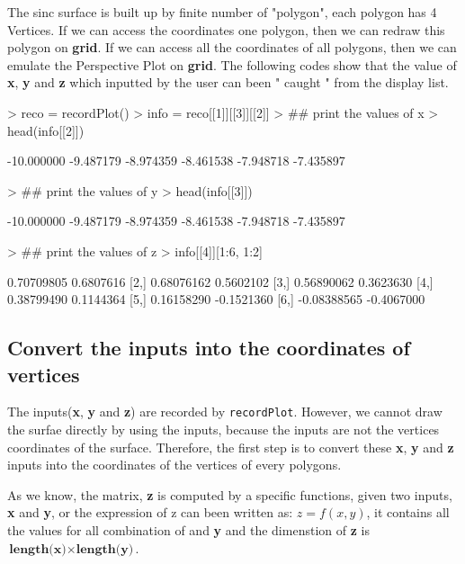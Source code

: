 \documentclass[paper=a4, fontsize=11pt]{report}
\begin{document}
The sinc surface is built up by finite number of "polygon", each polygon has 4 Vertices.
If we can access the coordinates one polygon, then we can redraw this polygon on \textbf{grid}. If we can access all the coordinates of all polygons, then we can emulate the Perspective Plot on \textbf{grid}. The following codes show that the value of \textbf{x}, \textbf{y} and \textbf{z} which inputted by the user can been " caught " from the display list.
\begin{Schunk}
\begin{Sinput}
> reco = recordPlot()
> info = reco[[1]][[3]][[2]]
> ## print the values of x
> head(info[[2]])
\end{Sinput}
\begin{Soutput}
[1] -10.000000  -9.487179  -8.974359  -8.461538  -7.948718  -7.435897
\end{Soutput}
\begin{Sinput}
> ## print the values of y
> head(info[[3]])
\end{Sinput}
\begin{Soutput}
[1] -10.000000  -9.487179  -8.974359  -8.461538  -7.948718  -7.435897
\end{Soutput}
\begin{Sinput}
> ## print the values of z
> info[[4]][1:6, 1:2]
\end{Sinput}
\begin{Soutput}
            [,1]       [,2]
[1,]  0.70709805  0.6807616
[2,]  0.68076162  0.5602102
[3,]  0.56890062  0.3623630
[4,]  0.38799490  0.1144364
[5,]  0.16158290 -0.1521360
[6,] -0.08388565 -0.4067000
\end{Soutput}
\end{Schunk}
\subsection{Convert the inputs into the coordinates of vertices}
The inputs(\textbf{x}, \textbf{y} and \textbf{z}) are recorded by \texttt{recordPlot}. However, we cannot draw the surfae directly by using the inputs, because the inputs are not the vertices coordinates of the surface. Therefore, the first step is to convert these \textbf{x}, \textbf{y} and \textbf{z} inputs into the coordinates of the vertices of every polygons.


As we know, the matrix, \textbf{z} is computed by a specific functions, given two inputs, \textbf{x} and \textbf{y}, or the expression of z can been written as: $z = f(x,y)$, it contains all the values for all combination of  and \textbf{y} and the dimenstion of \textbf{z} is $ \textbf{length(x)} \times \textbf{length(y)}$.\\
\end{document}

